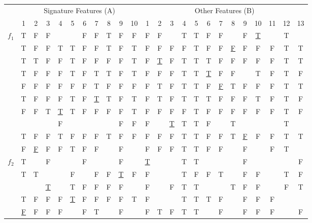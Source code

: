 \begin{table}[h]
\tiny
\begin{tabular}{|c|c|c|c|c|c|c|c|c|c|c||c|c|c|c|c|c|c|c|c|c|c|c|c|}
  \hline
  & \multicolumn{10}{c||}{Signature Features (A)} & \multicolumn{13}{c|}{Other Features (B)} \\
  \cline{2-24}
   & 1 & 2 & 3 & 4 & 5 & 6 & 7 & 8 & 9 & 10 & 1 & 2 & 3 & 4 & 5 & 6 & 7 & 8 & 9 & 10 & 11 & 12 & 13 \\
  \hline                 %
   \multirow{10}{*}{$f_1$}&T&F&F& & &F&F&T&F&F&F&F& &T&T&F&F& &F&\underline{T}& &T& \\
                          &T&F&F&T&T&F&F&T&F&T&F&F&F&F&T&F&F&\underline{F}&F&F&F&T&T\\
                          &T&T&F&F&T&F&F&F&F&T&F&\underline{T}&F&T&T&T&F&F&F&F&F&T&T\\
                          &T&F&F&F&T&F&T&T&F&T&F&F&F&T&T&\underline{T}&F&F& &T&F&T&F\\
                          &F&F&F&F&F&F&T&F&F&F&F&T&F&T&T&F&\underline{F}&T&F&F&F&T&T\\
                          &T&F&F&F&T&F&\underline{T}&T&F&T&F&T&F&T&T&T&F&F&F&T&F&T&F\\
                          &F&F&T&\underline{T}&T&F&F&F&F&T&F&F&F&F&T&F&F&F&F&F&F&T&F\\
                          & & & &F& & & & &F&F&F& &\underline{T}&T&T&F& &T& & & &T& \\
                          &T&F&F&T&F&F&F&T&F&F&F&F&F&T&T&F&F&T&\underline{F}&F&F&T&T\\
                          &F&\underline{F}&F&F&T&F&F& &F& &F&F&F&T&T&F&F& &F& &F&T& \\
  \hline                 %
   \multirow{5}{*}{$f_2$} &T& &F& & &F& & &F& &\underline{T}& & &T&T& & & &F& & & &F\\
                          &T&T& & &F& &F&F&\underline{T}&F&F& & &T&F&F&T& &F&F& &T&F\\
                          & & &\underline{T}& &T&F&F&F&F& &F& &F&T&T& & &T&F&F& &F&T\\
                          &T&F&F&F&\underline{T}&F&F&F&F&T&F& & &T&T&T&F& &F&F&F& & \\
                          &\underline{F}&F&F&F& &F&T& &F& &F&T&F&T&T& &F& &F&F&F& &F\\
  \hline
\end{tabular}
\end{table}

